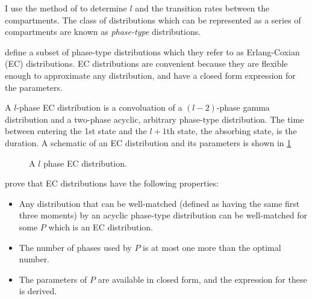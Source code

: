 \documentclass[thesis.tex]{subfiles}
\begin{document}
I use the method of \textcite{osogamiClosed} to determine $l$ and the transition rates between the compartments.
The class of distributions which can be represented as a series of compartments are known as \emph{phase-type} distributions.

\Textcite{osogamiClosed} define a subset of phase-type distributions which they refer to as Erlang-Coxian (EC) distributions.
EC distributions are convenient because they are flexible enough to approximate any distribution, and have a closed form expression for the parameters.

A $l$-phase EC distribution is a convoluation of a $(l-2)$-phase gamma distribution and a two-phase acyclic, arbitrary phase-type distribution.
The time between entering the 1st state and the $l+1$th state, the absorbing state, is the duration.
A schematic of an EC distribution and its parameters is shown in \cref{SEIR:fig:EC}

\begin{figure}
\caption{A $l$ phase EC distribution.}
\label{SEIR:fig:EC}
\end{figure}

\Textcite{osogamiClosed} prove that EC distributions have the following properties:
\begin{itemize}
    \item Any distribution that can be well-matched (defined as having the same first three moments) by an acyclic phase-type distribution can be well-matched for some $P$ which is an EC distribution.
    \item The number of phases used by $P$ is at most one more than the optimal number.
    \item The parameters of $P$ are available in closed form, and the expression for these is derived.
\end{itemize}
\end{document}
